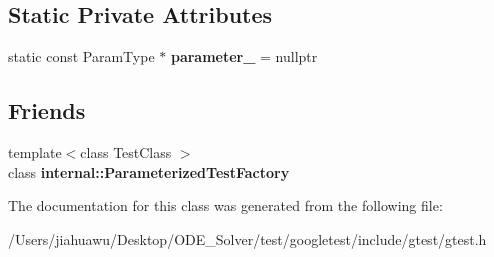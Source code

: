 \subsection*{Static Private Attributes}
\begin{DoxyCompactItemize}
\item 
\mbox{\label{classtesting_1_1_with_param_interface_ad809d968c4285b535c5c74718d40ccf0}} 
static const Param\+Type $\ast$ {\bfseries parameter\+\_\+} = nullptr
\end{DoxyCompactItemize}
\subsection*{Friends}
\begin{DoxyCompactItemize}
\item 
\mbox{\label{classtesting_1_1_with_param_interface_a7543eb7df89f00fff517dba24bc11dd5}} 
{\footnotesize template$<$class Test\+Class $>$ }\\class {\bfseries internal\+::\+Parameterized\+Test\+Factory}
\end{DoxyCompactItemize}


The documentation for this class was generated from the following file\+:\begin{DoxyCompactItemize}
\item 
/\+Users/jiahuawu/\+Desktop/\+O\+D\+E\+\_\+\+Solver/test/googletest/include/gtest/gtest.\+h\end{DoxyCompactItemize}

